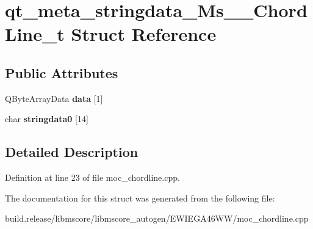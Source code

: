 \hypertarget{structqt__meta__stringdata___ms_____chord_line__t}{}\section{qt\+\_\+meta\+\_\+stringdata\+\_\+\+Ms\+\_\+\+\_\+\+Chord\+Line\+\_\+t Struct Reference}
\label{structqt__meta__stringdata___ms_____chord_line__t}
\subsection*{Public Attributes}
\begin{DoxyCompactItemize}
\item 
\mbox{\label{structqt__meta__stringdata___ms_____chord_line__t_a1a6e4405763d67e1435cb06e89b6b714}} 
Q\+Byte\+Array\+Data {\bfseries data} \mbox{[}1\mbox{]}
\item 
\mbox{\label{structqt__meta__stringdata___ms_____chord_line__t_a6d9f8859b2bb205bcf8c4d914a620e68}} 
char {\bfseries stringdata0} \mbox{[}14\mbox{]}
\end{DoxyCompactItemize}


\subsection{Detailed Description}


Definition at line 23 of file moc\+\_\+chordline.\+cpp.



The documentation for this struct was generated from the following file\+:\begin{DoxyCompactItemize}
\item 
build.\+release/libmscore/libmscore\+\_\+autogen/\+E\+W\+I\+E\+G\+A46\+W\+W/moc\+\_\+chordline.\+cpp\end{DoxyCompactItemize}
